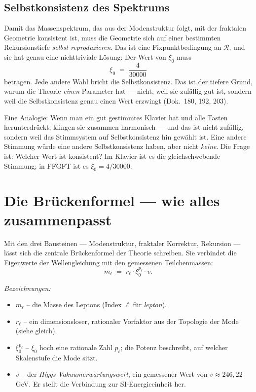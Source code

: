 \subsection*{Selbstkonsistenz des Spektrums}
Damit das Massenspektrum, das aus der Modenstruktur folgt, mit der
fraktalen Geometrie konsistent ist, muss die Geometrie sich auf
einer bestimmten Rekursionstiefe \emph{selbst reproduzieren}. Das
ist eine Fixpunktbedingung an $\mathcal{R}$, und sie hat genau eine
nichttriviale Lösung: Der Wert von $\xi_0$ muss
\[
  \xi_0 \;=\; \frac{4}{30000}
\]
betragen. Jede andere Wahl bricht die Selbstkonsistenz. Das ist der
tiefere Grund, warum die Theorie \emph{einen} Parameter hat ---
nicht, weil sie zufällig gut ist, sondern weil die Selbstkonsistenz
genau einen Wert erzwingt (Dok.~180, 192, 203).

Eine Analogie: Wenn man ein gut gestimmtes Klavier hat und alle
Tasten herunterdrückt, klingen sie zusammen harmonisch --- und das
ist nicht zufällig, sondern weil das Stimmsystem auf
Selbstkonsistenz hin gewählt ist. Eine andere Stimmung würde eine
andere Selbstkonsistenz haben, aber nicht \emph{keine}. Die Frage
ist: Welcher Wert ist konsistent? Im Klavier ist es die
gleichschwebende Stimmung; in FFGFT ist es $\xi_0 = 4/30000$.

\section{Die Brückenformel --- wie alles zusammenpasst}

Mit den drei Bausteinen --- Modenstruktur, fraktaler Korrektur,
Rekursion --- lässt sich die zentrale Brückenformel der Theorie
schreiben. Sie verbindet die Eigenwerte der Wellengleichung mit den
gemessenen Teilchenmassen:
\[
  m_\ell \;=\; r_\ell \cdot \xi_0^{p_\ell} \cdot v.
\]

\noindent\textit{Bezeichnungen:}
\begin{itemize}\setlength\itemsep{0pt}
  \item $m_\ell$ -- die Masse des Leptons (Index $\ell$ für \emph{lepton}).
  \item $r_\ell$ -- ein dimensionsloser, rationaler Vorfaktor aus der
        Topologie der Mode (siehe gleich).
  \item $\xi_0^{p_\ell}$ -- $\xi_0$ hoch eine rationale Zahl $p_\ell$;
        die Potenz beschreibt, auf welcher Skalenstufe die Mode sitzt.
  \item $v$ -- der \emph{Higgs-Vakuumerwartungswert}, ein gemessener
        Wert von $v \approx 246{,}22$\,GeV. Er stellt die Verbindung
        zur SI-Energieeinheit her.
\end{itemize}


